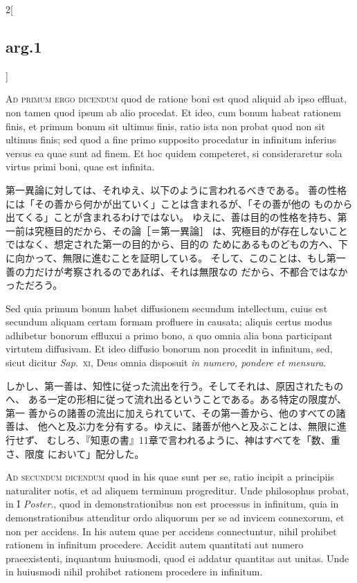 \documentclass[paper=a4paper,fontsize=10pt,jafontsize=9pt,titlepage]{jlreq}
\begin{document}
\begin{paracol}{2}[\subsection{arg.1}]
\switchcolumn*[\subsection{ad.1}]

{\scshape Ad primum ergo dicendum} quod de ratione
boni est quod aliquid ab ipso effluat, non tamen quod ipsum ab alio
procedat. Et ideo, cum bonum habeat rationem finis, et primum bonum sit
ultimus finis, ratio ista non probat quod non sit ultimus finis; sed
quod a fine primo supposito procedatur in infinitum inferius versus ea
quae sunt ad finem. Et hoc quidem competeret, si consideraretur sola
virtus primi boni, quae est infinita.

\switchcolumn

第一異論に対しては、それゆえ、以下のように言われるべきである。
善の性格には「その善から何かが出ていく」ことは含まれるが、「その善が他の
 ものから出てくる」ことが含まれるわけではない。
ゆえに、善は目的の性格を持ち、第一前は究極目的だから、その論［＝第一異論］
 は、究極目的が存在しないことではなく、想定された第一の目的から、目的の
 ためにあるものどもの方へ、下に向かって、無限に進むことを証明している。
そして、このことは、もし第一善の力だけが考察されるのであれば、それは無限なの
 だから、不都合ではなかっただろう。

\switchcolumn*

Sed quia primum bonum habet
diffusionem secundum intellectum, cuius est secundum aliquam certam
formam profluere in causata; aliquis certus modus adhibetur bonorum
effluxui a primo bono, a quo omnia alia bona participant virtutem
diffusivam. Et ideo diffusio bonorum non procedit in infinitum, sed,
sicut dicitur {\itshape Sap}.~{\scshape xi}, Deus omnia disposuit {\itshape in numero, pondere et
mensura}.

\switchcolumn

しかし、第一善は、知性に従った流出を行う。そしてそれは、原因されたものへ、
 ある一定の形相に従って流れ出るということである。ある特定の限度が、第一
 善からの諸善の流出に加えられていて、その第一善から、他のすべての諸善は、
 他へと及ぶ力を分有する。ゆえに、諸善が他へと及ぶことは、無限に進行せず、
 むしろ、『知恵の書』11章で言われるように、神はすべてを「数、重さ、限度
 において」配分した。

\switchcolumn*[\subsection{ad.2}]

{\scshape Ad secundum dicendum} quod in his quae
sunt per se, ratio incipit a principiis naturaliter notis, et ad aliquem
terminum progreditur. Unde philosophus probat, in I {\itshape Poster}., quod in
demonstrationibus non est processus in infinitum, quia in
demonstrationibus attenditur ordo aliquorum per se ad invicem
connexorum, et non per accidens. In his autem quae per accidens
connectuntur, nihil prohibet rationem in infinitum procedere. Accidit
autem quantitati aut numero praeexistenti, inquantum huiusmodi, quod ei
addatur quantitas aut unitas. Unde in huiusmodi nihil prohibet rationem
procedere in infinitum.


\end{paracol}
\end{document}
